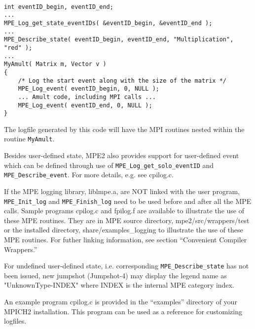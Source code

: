 \documentclass[dvipdfm,11pt]{article}
\begin{document}
\begin{verbatim}

int eventID_begin, eventID_end;
...
MPE_Log_get_state_eventIDs( &eventID_begin, &eventID_end );
...
MPE_Describe_state( eventID_begin, eventID_end, "Multiplication", "red" );
...
MyAmult( Matrix m, Vector v )
{
    /* Log the start event along with the size of the matrix */
    MPE_Log_event( eventID_begin, 0, NULL );
    ... Amult code, including MPI calls ...
    MPE_Log_event( eventID_end, 0, NULL );
}

\end{verbatim}

The logfile generated by this code will have the MPI routines nested within
the routine \texttt{MyAmult}.

Besides user-defined state, MPE2 also provides support for user-defined
event which can be defined through use of \texttt{MPE\_Log\_get\_solo\_eventID}
and \texttt{MPE\_Describe\_event}.  For more details, e.g. see cpilog.c.

If the MPE logging library, liblmpe.a, are NOT linked with the user program,
\texttt{MPE\_Init\_log} and \texttt{MPE\_Finish\_log} need to be used before and after all
the MPE calls.   Sample programs cpilog.c and fpilog.f are available to
illustrate the use of these MPE routines.  They are in MPE
source directory, mpe2/src/wrappers/test or the installed directory,
share/examples\_logging to illustrate the use of these MPE routines.
For futher linking information, see section ``Convenient Compiler Wrappers.''

For undefined user-defined state, i.e. corresponding \texttt{MPE\_Describe\_state}
has not been issued, new jumpshot (Jumpshot-4) may display the legend name as
"UnknownType-INDEX" where INDEX is the internal MPE category index.

An example program cpilog.c is provided in the ``examples'' directory of your
MPICH2 installation. This program can be used as a reference for customizing
logfiles.
\end{document}
